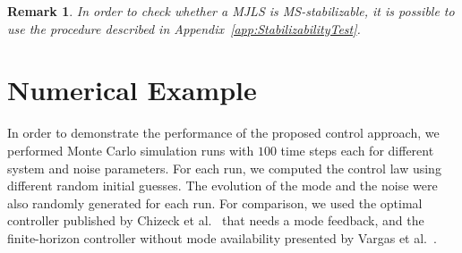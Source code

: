 \documentclass[preprint,1p,11pt]{IR-Template/ISAS_IR}
\newtheorem{remark}{Remark}
\begin{document}
\begin{remark}
In order to check whether a MJLS is MS-stabilizable, it is possible to use the procedure described in Appendix~\ref{app:StabilizabilityTest}.
\end{remark}



%
    	
   \section{Numerical Example}
   	\label{sec:NumericalExample}
   	In order to demonstrate the performance of the proposed control approach, we performed Monte Carlo simulation runs with $100$ time steps each for different system and noise parameters. For each run, we computed the control law using different random initial guesses. The evolution of the mode and the noise were also randomly generated for each run. For comparison, we used the optimal controller published by Chizeck et al.~\cite{Chizeck_1986} that needs a mode feedback, and the finite-horizon controller without mode availability presented by Vargas et al.~\cite{Vargas_2013}.\\
\end{document}
